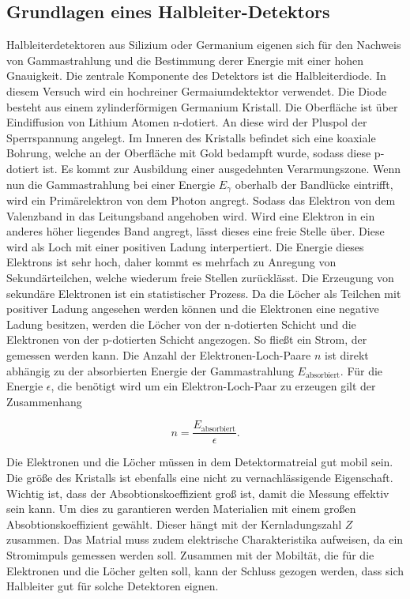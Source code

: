 \subsection{Grundlagen eines Halbleiter-Detektors}
\label{sec:Halbleiter-Detektor}

Halbleiterdetektoren aus Silizium oder Germanium eigenen sich für den Nachweis von Gammastrahlung und die Bestimmung derer Energie mit einer hohen Gnauigkeit.
Die zentrale Komponente des Detektors ist die Halbleiterdiode. In diesem Versuch wird ein hochreiner Germaiumdektektor verwendet.
Die Diode besteht aus einem zylinderförmigen Germanium Kristall. Die Oberfläche ist über Eindiffusion von Lithium Atomen n-dotiert.
An diese wird der Pluspol der Sperrspannung angelegt. Im Inneren des Kristalls befindet sich eine koaxiale Bohrung, welche an der Oberfläche mit Gold bedampft wurde, sodass diese p-dotiert ist.
Es kommt zur Ausbildung einer ausgedehnten Verarmungszone. Wenn nun die Gammastrahlung bei einer Energie $E_{\gamma} $ oberhalb der Bandlücke eintrifft, wird ein Primärelektron von dem Photon angregt.
Sodass das Elektron von dem Valenzband in das Leitungsband angehoben wird. Wird eine Elektron in ein anderes höher liegendes Band angregt, lässt dieses eine freie Stelle über. 
Diese wird als Loch mit einer positiven Ladung interpertiert.
Die Energie dieses Elektrons ist sehr hoch, daher kommt es mehrfach zu Anregung von Sekundärteilchen, welche wiederum freie Stellen zurücklässt. Die Erzeugung von sekundäre Elektronen ist ein statistischer Prozess.
Da die Löcher als Teilchen mit positiver Ladung angesehen werden können und die Elektronen eine negative Ladung besitzen, werden die Löcher von der n-dotierten Schicht und die Elektronen von der p-dotierten Schicht angezogen.
So fließt ein Strom, der gemessen werden kann.
Die Anzahl der Elektronen-Loch-Paare $n$ ist direkt abhängig zu der absorbierten Energie der Gammastrahlung $E_{\text{absorbiert}}$. Für die Energie $\epsilon$, die benötigt wird
um ein Elektron-Loch-Paar zu erzeugen gilt der Zusammenhang

\begin{equation}
    n = \frac{E_{\text{absorbiert}}}{\epsilon}.
\end{equation}

Die Elektronen und die Löcher müssen in dem Detektormatreial gut mobil sein. Die größe des Kristalls ist ebenfalls eine nicht zu vernachlässigende Eigenschaft.
Wichtig ist, dass der Absobtionskoeffizient groß ist, damit die Messung effektiv sein kann. Um dies zu garantieren werden Materialien mit einem großen Absobtionskoeffizient
gewählt. Dieser hängt mit der Kernladungszahl $Z$ zusammen. Das Matrial muss zudem elektrische Charakteristika aufweisen, da ein Stromimpuls gemessen werden soll. Zusammen mit der Mobiltät, die für die
Elektronen und die Löcher gelten soll, kann der Schluss gezogen werden, dass sich Halbleiter gut für solche Detektoren eignen.


